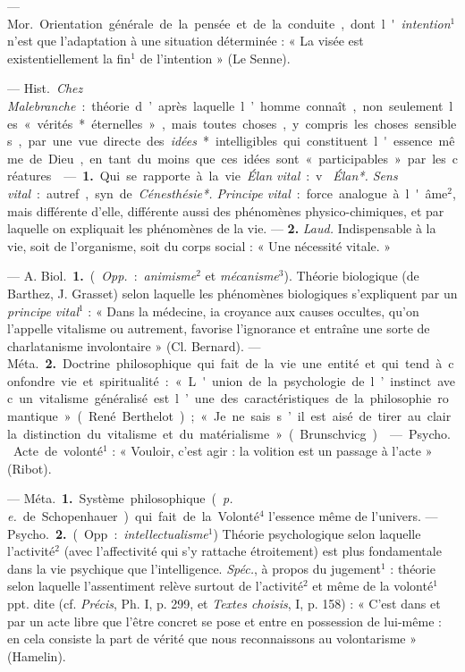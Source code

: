 \begin{itemize}[leftmargin=1cm, label=, itemsep=1pt]
 — \si{Mor.} Orientation générale de la pensée et de la conduite,
dont l'{\it intention}$^1$ n’est que l'adaptation à une situation
déterminée : « La visée est existentiellement la fin$^1$ de l'intention » (Le
Senne).

 —  \si{Hist.} {\it Chez Malebranche} :
théorie d’après laquelle l’homme connaît, non seulement les « vérités*
éternelles », mais toutes choses, y compris les choses sensibles, par une vue
directe des {\it idées}* intelligibles qui constituent l'essence même de
Dieu, en tant du moins que ces idées sont « participables » par les créatures.

 — {\bf 1.} Qui se rapporte à la vie. {\it Élan vital} : v. {\it
Élan*. Sens vital} : autref., syn. de {\it Cénesthésie*. Principe vital} :
force analogue à l'âme$^2$, mais différente d'elle, différente
aussi des phénomènes physico-chimiques, et par laquelle on expliquait les
phénomènes de la vie. —  {\bf 2.} {\it Laud.} Indispensable à la vie, soit de
l’organisme, soit du corps social : « Une nécessité vitale. »

 — A. \si{Biol.} {\bf 1.} ({\it Opp.} : {\it animisme}$^2$ et
{\it mécanisme}$^3$). Théorie biologique (de Barthez, J. Grasset) selon
laquelle les phénomènes biologiques s'expliquent par un {\it principe
vital}$^1$ : « Dans la médecine, ia croyance aux causes occultes, qu’on
l'appelle vitalisme ou autrement, favorise l'ignorance et entraîne une sorte
de charlatanisme involontaire » (Cl. Bernard). — \si{Méta.} {\bf 2.} Doctrine
philosophique qui fait de la vie une entité et qui tend à confondre vie et
spiritualité : « L'union de la psychologie de l’instinct avec un vitalisme
généralisé est l’une des caractéristiques de la philosophie romantique
» (René Berthelot) ; « Je ne sais s’il est aisé de tirer au clair la
distinction du vitalisme et du matérialisme » (Brunschvicg).

 — \si{Psycho.}  Acte de volonté$^1$ : « Vouloir,
c’est agir : la volition est un passage à l'acte » (Ribot).

 —  \si{Méta.} {\bf 1.} Système philosophique
({\it p. e.} de Schopenhauer) qui fait de la Volonté$^4$ l'essence même de
l'univers. — \si{Psycho.}  {\bf 2.} (Opp. : {\it intellectualisme}$^1$)
Théorie psychologique selon laquelle l’activité$^2$ (avec l’affectivité qui
s'y rattache étroitement) est plus fondamentale dans la vie psychique que
l'intelligence. {\it Spéc.}, à propos du jugement$^1$ : théorie selon
laquelle l'assentiment relève surtout de l’activité$^2$ et même de la
volonté$^1$ ppt. dite (cf. {\it Précis}, Ph. I, p. 299, et {\it Textes
choisis}, I, p. 158) : « C’est
dans et par un acte libre que l'être concret se pose et entre en possession
de lui-même : en cela consiste la part de vérité que nous reconnaissons au
volontarisme » (Hamelin).


\end{itemize}
